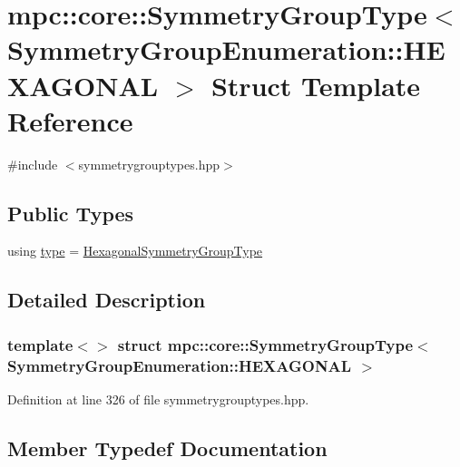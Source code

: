 \hypertarget{structmpc_1_1core_1_1_symmetry_group_type_3_01_symmetry_group_enumeration_1_1_h_e_x_a_g_o_n_a_l_01_4}{}\section{mpc\+:\+:core\+:\+:Symmetry\+Group\+Type$<$ Symmetry\+Group\+Enumeration\+:\+:H\+E\+X\+A\+G\+O\+N\+AL $>$ Struct Template Reference}
\label{structmpc_1_1core_1_1_symmetry_group_type_3_01_symmetry_group_enumeration_1_1_h_e_x_a_g_o_n_a_l_01_4}


{\ttfamily \#include $<$symmetrygrouptypes.\+hpp$>$}

\subsection*{Public Types}
\begin{DoxyCompactItemize}
\item 
using \mbox{\hyperlink{structmpc_1_1core_1_1_symmetry_group_type_3_01_symmetry_group_enumeration_1_1_h_e_x_a_g_o_n_a_l_01_4_a833ac3714c5e0f497d4f8509d20ac6aa}{type}} = \mbox{\hyperlink{structmpc_1_1core_1_1_hexagonal_symmetry_group_type}{Hexagonal\+Symmetry\+Group\+Type}}
\end{DoxyCompactItemize}


\subsection{Detailed Description}
\subsubsection*{template$<$$>$\newline
struct mpc\+::core\+::\+Symmetry\+Group\+Type$<$ Symmetry\+Group\+Enumeration\+::\+H\+E\+X\+A\+G\+O\+N\+A\+L $>$}



Definition at line 326 of file symmetrygrouptypes.\+hpp.



\subsection{Member Typedef Documentation}
\mbox{\label{structmpc_1_1core_1_1_symmetry_group_type_3_01_symmetry_group_enumeration_1_1_h_e_x_a_g_o_n_a_l_01_4_a833ac3714c5e0f497d4f8509d20ac6aa}} 
